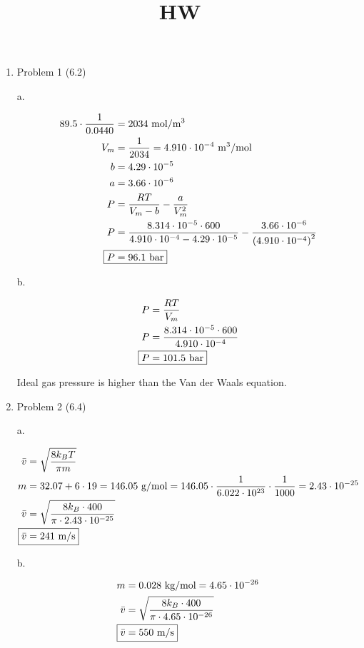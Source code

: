 \documentclass[12pt]{article}
\title{HW}
\date{}
\begin{document}
\begin{enumerate}

    \newpage
    \item Problem 1 (6.2)
    
    a.

    \begin{align*}
        89.5 \cdot \frac{1}{0.0440} &= 2034 \text{ mol/m$^3$} \\
        V_m &= \frac{1}{2034} = 4.910\cdot10^{-4} \text{ m$^3$/mol} \\
        b &= 4.29\cdot10^{-5} \\
        a &= 3.66\cdot10^{-6} \\
        P &= \frac{RT}{V_m-b} - \frac{a}{V_m^2} \\
        P &= \frac{8.314\cdot10^{-5}\cdot600}{4.910\cdot10^{-4}-4.29\cdot10^{-5}} - \frac{3.66\cdot10^{-6}}{\left(4.910\cdot10^{-4}\right)^2} \\
        \Aboxed{P &= 96.1 \text{ bar}}
    \end{align*}

    b. 

    \begin{align*}
        P &= \frac{RT}{V_m} \\
        P &= \frac{8.314\cdot10^{-5}\cdot600}{4.910\cdot10^{-4}} \\
        \Aboxed{P &= 101.5 \text{ bar}}
    \end{align*}

    Ideal gas pressure is higher than the Van der Waals equation.
    
    \newpage
    \item Problem 2 (6.4)
    
    a.

    \begin{align*}
        \bar{v} &= \sqrt{\frac{8k_BT}{\pi m}} \\
        m &= 32.07 + 6\cdot19 = 146.05 \text{ g/mol} = 146.05 \cdot \frac{1}{6.022\cdot10^{23}} \cdot \frac{1}{1000} = 2.43\cdot10^{-25} \\
        \bar{v} &= \sqrt{\frac{8k_B\cdot400}{\pi \cdot 2.43\cdot10^{-25}}} \\
        \Aboxed{\bar{v} &= 241 \text{ m/s}}
    \end{align*}

    b.

    \begin{align*}
        m &= 0.028 \text{ kg/mol} = 4.65\cdot10^{-26} \\
        \bar{v} &= \sqrt{\frac{8k_B\cdot400}{\pi \cdot 4.65\cdot10^{-26}}} \\
        \Aboxed{\bar{v} &= 550 \text{ m/s}}
    \end{align*}


\end{enumerate}
\end{document}
